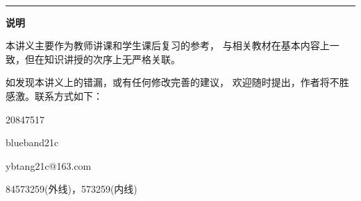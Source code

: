 






\answertrue
\hinttrue
\nottesttrue

\ifnottest
	\setcounter{tocdepth}{3}%
	\tableofcontents
\fi


\thispagestyle{empty}

\let\itemize\compactitem 
\let\enditemize\endcompactitem 
\let\enumerate\compactenum
\let\endenumerate\endcompactenum 
\let\description\compactdesc 
\let\enddescription\endcompactdesc
\setlength{\pltopsep}{0pt}
\setlength\abovedisplayskip{0pt}
\setlength\belowdisplayskip{0pt}

\ifnottest
	\bs\bs

	\hrule

	\bs\bs 
	{\bf 说明}

	{\kaishu 本讲义主要作为教师讲课和学生课后复习的参考，
	与相关教材在基本内容上一致，但在知识讲授的次序上无严格关联。}

	\bs

	{\kaishu 如发现本讲义上的错漏，或有任何修改完善的建议，
	欢迎随时提出，作者将不胜感激。联系方式如下：
	\begin{description}
		\setlength{\itemindent}{2cm}
		\item[QQ] 20847517
		\item[WeChat] blueband21c
		\item[email] ybtang21c@163.com
		\item[phone] 84573259(外线)，573259(内线) 
	\end{description}
	}

	\newpage
\fi

%

\setcounter{page}{1}




